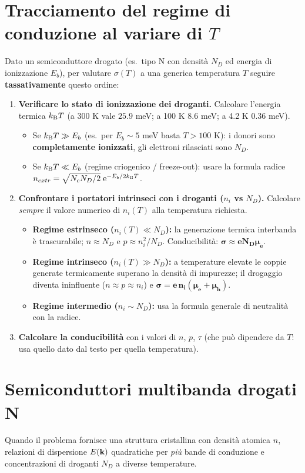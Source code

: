 \section{Tracciamento del regime di conduzione al variare di $T$}
Dato un semiconduttore drogato (es.\ tipo N con densità $N_D$ ed energia di ionizzazione $E_b$), per valutare $\sigma(T)$ a una generica temperatura $T$ seguire \textbf{tassativamente} questo ordine:
\begin{enumerate}
    \setlength{\itemsep}{2pt}
    \item \textbf{Verificare lo stato di ionizzazione dei droganti.} Calcolare l'energia termica $k_{\mathrm{B}} T$ (a 300 K vale $25.9$ meV; a 100 K $8.6$ meV; a 4.2 K $0.36$ meV).
    \begin{itemize}
        \item Se $k_{\mathrm{B}} T\gg E_b$ (es.\ per $E_b\sim5$ meV basta $T>100$ K): i donori sono \textbf{completamente ionizzati}, gli elettroni rilasciati sono $N_D$.
        \item Se $k_{\mathrm{B}} T\ll E_b$ (regime criogenico / freeze-out): usare la formula radice $n_{extr}=\sqrt{N_cN_D/2}\;\mathrm{e}^{-E_b/2k_{\mathrm{B}} T}$.
    \end{itemize}
    \item \textbf{Confrontare i portatori intrinseci con i droganti ($n_i$ vs $N_D$).} Calcolare \emph{sempre} il valore numerico di $n_i(T)$ alla temperatura richiesta.
    \begin{itemize}
        \item \textbf{Regime estrinseco ($n_i(T)\ll N_D$):} la generazione termica interbanda è trascurabile; $n\approx N_D$ e $p\approx n_i^2/N_D$. Conducibilità: $\bm{\sigma\approx eN_D\mu_e}$.
        \item \textbf{Regime intrinseco ($n_i(T)\gg N_D$):} a temperature elevate le coppie generate termicamente superano la densità di impurezze; il drogaggio diventa ininfluente ($n\approx p\approx n_i$) e $\bm{\sigma = e\,n_i(\mu_e+\mu_h)}$.
        \item \textbf{Regime intermedio ($n_i \sim N_D$):} usa la formula generale di neutralità con la radice.
    \end{itemize}
    \item \textbf{Calcolare la conducibilità} con i valori di $n$, $p$, $\tau$ (che può dipendere da $T$: usa quello dato dal testo per quella temperatura).
\end{enumerate}

\section{Semiconduttori multibanda drogati N}
Quando il problema fornisce una struttura cristallina con densità atomica $n$, relazioni di dispersione $E(\mathbf{k})$ quadratiche per \emph{più} bande di conduzione e concentrazioni di droganti $N_D$ a diverse temperature.

